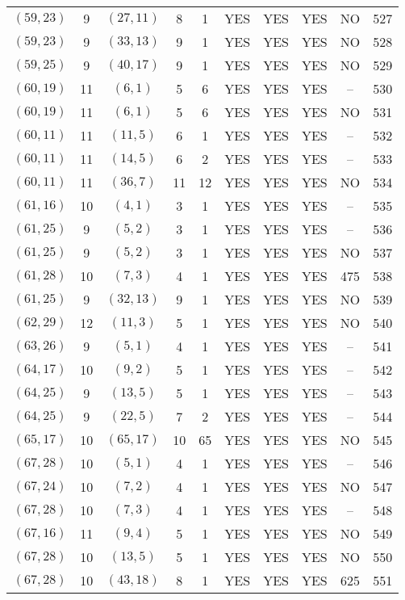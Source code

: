\begin{longtable}{|c|c|c|c|c|c|c|c|c|c|}
$(59, 23)$ & 9 & $(27, 11)$ & 8 & 1 & YES & YES & YES & NO & 527\\
$(59, 23)$ & 9 & $(33, 13)$ & 9 & 1 & YES & YES & YES & NO & 528\\
$(59, 25)$ & 9 & $(40, 17)$ & 9 & 1 & YES & YES & YES & NO & 529\\
$(60, 19)$ & 11 & $(6, 1)$ & 5 & 6 & YES & YES & YES & -- & 530\\
$(60, 19)$ & 11 & $(6, 1)$ & 5 & 6 & YES & YES & YES & NO & 531\\
$(60, 11)$ & 11 & $(11, 5)$ & 6 & 1 & YES & YES & YES & -- & 532\\
$(60, 11)$ & 11 & $(14, 5)$ & 6 & 2 & YES & YES & YES & -- & 533\\
$(60, 11)$ & 11 & $(36, 7)$ & 11 & 12 & YES & YES & YES & NO & 534\\
$(61, 16)$ & 10 & $(4, 1)$ & 3 & 1 & YES & YES & YES & -- & 535\\
$(61, 25)$ & 9 & $(5, 2)$ & 3 & 1 & YES & YES & YES & -- & 536\\
$(61, 25)$ & 9 & $(5, 2)$ & 3 & 1 & YES & YES & YES & NO & 537\\
$(61, 28)$ & 10 & $(7, 3)$ & 4 & 1 & YES & YES & YES & 475 & 538\\
$(61, 25)$ & 9 & $(32, 13)$ & 9 & 1 & YES & YES & YES & NO & 539\\
$(62, 29)$ & 12 & $(11, 3)$ & 5 & 1 & YES & YES & YES & NO & 540\\
$(63, 26)$ & 9 & $(5, 1)$ & 4 & 1 & YES & YES & YES & -- & 541\\
$(64, 17)$ & 10 & $(9, 2)$ & 5 & 1 & YES & YES & YES & -- & 542\\
$(64, 25)$ & 9 & $(13, 5)$ & 5 & 1 & YES & YES & YES & -- & 543\\
$(64, 25)$ & 9 & $(22, 5)$ & 7 & 2 & YES & YES & YES & -- & 544\\
$(65, 17)$ & 10 & $(65, 17)$ & 10 & 65 & YES & YES & YES & NO & 545\\
$(67, 28)$ & 10 & $(5, 1)$ & 4 & 1 & YES & YES & YES & -- & 546\\
$(67, 24)$ & 10 & $(7, 2)$ & 4 & 1 & YES & YES & YES & NO & 547\\
$(67, 28)$ & 10 & $(7, 3)$ & 4 & 1 & YES & YES & YES & -- & 548\\
$(67, 16)$ & 11 & $(9, 4)$ & 5 & 1 & YES & YES & YES & NO & 549\\
$(67, 28)$ & 10 & $(13, 5)$ & 5 & 1 & YES & YES & YES & NO & 550\\
$(67, 28)$ & 10 & $(43, 18)$ & 8 & 1 & YES & YES & YES & 625 & 551\\

\end{longtable}
